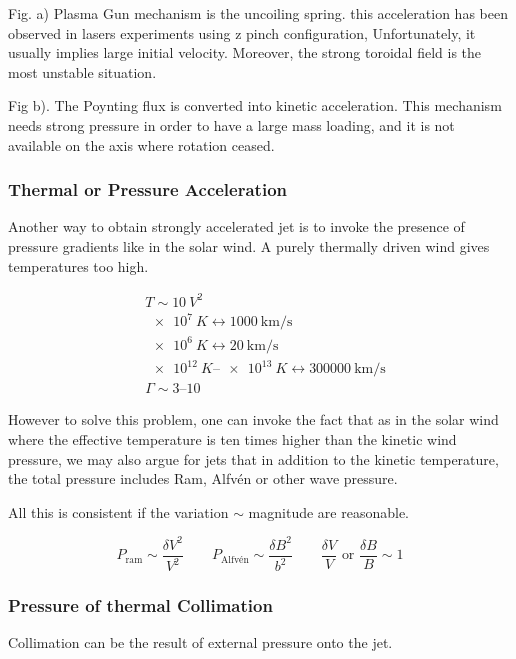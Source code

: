 \documentclass[10pt,a4paper,english]{article}
\begin{document}
Fig. a) Plasma Gun mechanism is the uncoiling spring. this acceleration has been observed in lasers experiments using z pinch configuration, Unfortunately, it usually implies large initial velocity.
Moreover, the strong toroidal field is the most unstable situation.

Fig b). The Poynting flux is converted into kinetic acceleration. This mechanism needs strong pressure
in order to have  a large mass loading, and it is not available on the axis where rotation ceased.

\subsubsection{Thermal or Pressure Acceleration}

Another way to obtain strongly accelerated jet is to invoke the presence of pressure gradients
like in the solar wind. A purely thermally driven wind gives temperatures too high.

\begin{align*}
    & T \sim \SI{10}{V^2} \\
    & \SI{e7}{K} \leftrightarrow	  \SI{1000}{\km\per \s } \\
    & \SI{e6}{K} \leftrightarrow \SI{20}{\km \per\s}  \\
    &\SIrange{e12}{e13}{K} \leftrightarrow  \SI{300000}{\km \per \s} \\
    & \Gamma \sim \numrange{3}{10}
\end{align*}

However to solve this problem, one can invoke the fact that as in the solar wind where the
effective temperature is ten times higher than the kinetic wind pressure, we may also argue
for jets that in addition to the kinetic temperature, the total pressure includes Ram, Alfvén
or other wave pressure.


All this is consistent if the variation $\sim$ magnitude are reasonable.

\begin{equation}
    P_\mathrm{ram} \sim \frac{\delta V^2}{V^2} \qquad
    P_\textrm{Alfvén}	\sim \frac{\delta B^2}{b^2} \qquad
    \frac{\delta V}{V } \text{ or } \frac{\delta B}{B} \sim 1
\end{equation}
\subsubsection{Pressure of thermal Collimation}
Collimation can be the result of external pressure onto the jet.
\end{document}
